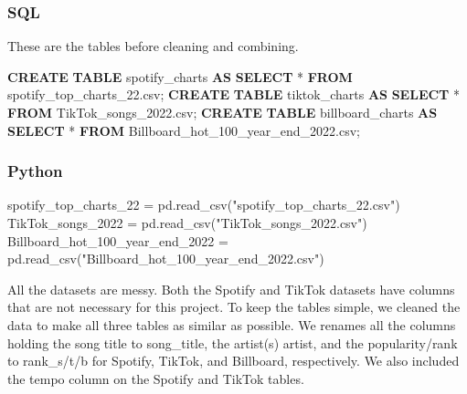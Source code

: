 \documentclass[
  letterpaper,
  DIV=11,
  numbers=noendperiod]{scrreprt}
\newenvironment{Shaded}{\begin{snugshade}}{\end{snugshade}}
\newcommand{\KeywordTok}[1]{\textcolor[rgb]{0.00,0.23,0.31}{\textbf{#1}}}
\newcommand{\NormalTok}[1]{\textcolor[rgb]{0.00,0.23,0.31}{#1}}
\newcommand{\OperatorTok}[1]{\textcolor[rgb]{0.37,0.37,0.37}{#1}}
\newcommand{\StringTok}[1]{\textcolor[rgb]{0.13,0.47,0.30}{#1}}
\begin{document}
\subsubsection{SQL}

These are the tables before cleaning and combining.

\begin{Shaded}
\begin{Highlighting}[]
\KeywordTok{CREATE} \KeywordTok{TABLE}\NormalTok{ spotify\_charts }\KeywordTok{AS}
  \KeywordTok{SELECT} \OperatorTok{*} \KeywordTok{FROM} \StringTok{\textquotesingle{}spotify\_top\_charts\_22.csv\textquotesingle{}}\NormalTok{;}
\KeywordTok{CREATE} \KeywordTok{TABLE}\NormalTok{ tiktok\_charts }\KeywordTok{AS}
  \KeywordTok{SELECT} \OperatorTok{*} \KeywordTok{FROM} \StringTok{\textquotesingle{}TikTok\_songs\_2022.csv\textquotesingle{}}\NormalTok{;}
\KeywordTok{CREATE} \KeywordTok{TABLE}\NormalTok{ billboard\_charts }\KeywordTok{AS}
  \KeywordTok{SELECT} \OperatorTok{*} \KeywordTok{FROM} \StringTok{\textquotesingle{}Billboard\_hot\_100\_year\_end\_2022.csv\textquotesingle{}}\NormalTok{;}
\end{Highlighting}
\end{Shaded}

\subsubsection{Python}

\begin{Shaded}
\begin{Highlighting}[]
\NormalTok{spotify\_top\_charts\_22 }\OperatorTok{=}\NormalTok{ pd.read\_csv(}\StringTok{"spotify\_top\_charts\_22.csv"}\NormalTok{)}
\NormalTok{TikTok\_songs\_2022 }\OperatorTok{=}\NormalTok{ pd.read\_csv(}\StringTok{"TikTok\_songs\_2022.csv"}\NormalTok{)}
\NormalTok{Billboard\_hot\_100\_year\_end\_2022 }\OperatorTok{=}\NormalTok{ pd.read\_csv(}\StringTok{"Billboard\_hot\_100\_year\_end\_2022.csv"}\NormalTok{)}
\end{Highlighting}
\end{Shaded}

All the datasets are messy. Both the Spotify and TikTok datasets have
columns that are not necessary for this project. To keep the tables
simple, we cleaned the data to make all three tables as similar as
possible. We renames all the columns holding the song title to
song\_title, the artist(s) artist, and the popularity/rank to
rank\_s/t/b for Spotify, TikTok, and Billboard, respectively. We also
included the tempo column on the Spotify and TikTok tables.
\end{document}
